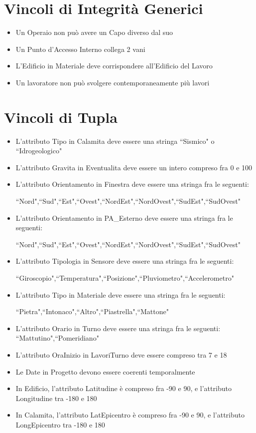 \documentclass[12pt,a4paper]{report}
\begin{document}
        \section{Vincoli di Integrità Generici}
            \begin{itemize}
                \item Un Operaio non può avere un Capo diverso dal suo
                \item Un Punto d'Accesso Interno collega 2 vani
                \item L'Edificio in Materiale deve corrispondere all'Edificio del Lavoro
                \item Un lavoratore non può svolgere contemporaneamente più lavori
            \end{itemize}
        \section{Vincoli di Tupla}
            \begin{itemize}
                \item L'attributo Tipo in Calamita deve essere una stringa ``Sismico" o ``Idrogeologico"
                \item L'attributo Gravita in Eventualita deve essere un intero compreso fra 0 e 100
                \item L'attributo Orientamento in Finestra deve essere una stringa fra le seguenti:
                
                ``Nord",``Sud",``Est",``Ovest",``NordEst",``NordOvest",``SudEst",``SudOvest"
                \item L'attributo Orientamento in PA\_Esterno deve essere una stringa fra le seguenti: 
                
                ``Nord",``Sud",``Est",``Ovest",``NordEst",``NordOvest",``SudEst",``SudOvest"
                \item L'attributo Tipologia in Sensore deve essere una stringa fra le seguenti: 
                
                ``Giroscopio",``Temperatura",``Posizione",``Pluviometro",``Accelerometro"
                \item L'attributo Tipo in Materiale deve essere una stringa fra le seguenti: 
                
                ``Pietra",``Intonaco",``Altro",``Piastrella",``Mattone"
                \item L'attributo Orario in Turno deve essere una stringa fra le seguenti: ``Mattutino",``Pomeridiano"
                \item L'attributo OraInizio in LavoriTurno deve essere compreso tra 7 e 18
                \item Le Date in Progetto devono essere coerenti temporalmente
                \item In Edificio, l'attributo Latitudine è compreso fra -90 e 90, e l'attributo Longitudine tra -180 e 180
                \item In Calamita, l'attributo LatEpicentro è compreso fra -90 e 90, e l'attributo LongEpicentro tra -180 e 180
            \end{itemize}
\end{document}
